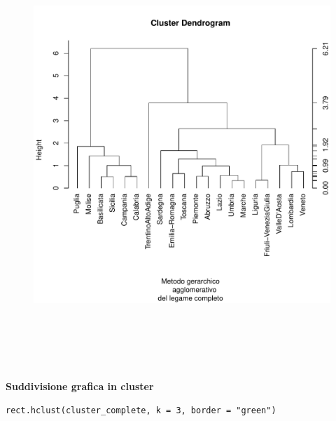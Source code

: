 \vspace{5mm}
\begin{figure}[!htbp]
    \centering
    \includegraphics[height=16cm]{ProgettoSAD/capitoli/images/clustering/dendro_clcomp.pdf}
\end{figure}
\vspace{5mm}

\noindent \textbf{Suddivisione grafica in cluster}

\vspace{5mm}
\begin{lstlisting}
rect.hclust(cluster_complete, k = 3, border = "green")
\end{lstlisting}
\vspace{5mm}

